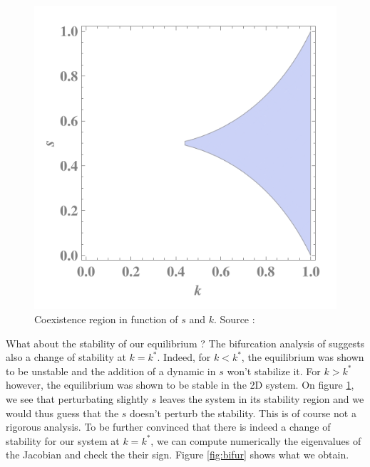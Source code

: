 \documentclass{article}
\begin{document}
\begin{figure}[H]
\centering
\includegraphics[scale=0.5]{coexistence.png}
\caption{Coexistence region in function of $s$ and $k$. Source : \cite{bilingual}}
\label{fig:coexistence}
\end{figure}

What about the stability of our equilibrium ?
The bifurcation analysis of \cite{bilingual} suggests also a change of stability at $k=k^{\ast}$.
Indeed, for $k<k^{\ast}$, the equilibrium was shown to be unstable and the addition of a dynamic in $s$ won't stabilize it.
For $k>k^{\ast}$ however, the equilibrium was shown to be stable in the 2D system.
On figure \ref{fig:coexistence}, we see that perturbating slightly $s$ leaves the system in its stability region and we would thus guess that the $s$ doesn't perturb the stability.
This is of course not a rigorous analysis.
To be further convinced that there is indeed a change of stability for our system at $k=k^{\ast}$, we can compute numerically the eigenvalues of the Jacobian and check the their sign.
Figure \ref{fig:bifur} shows what we obtain.
\end{document}
